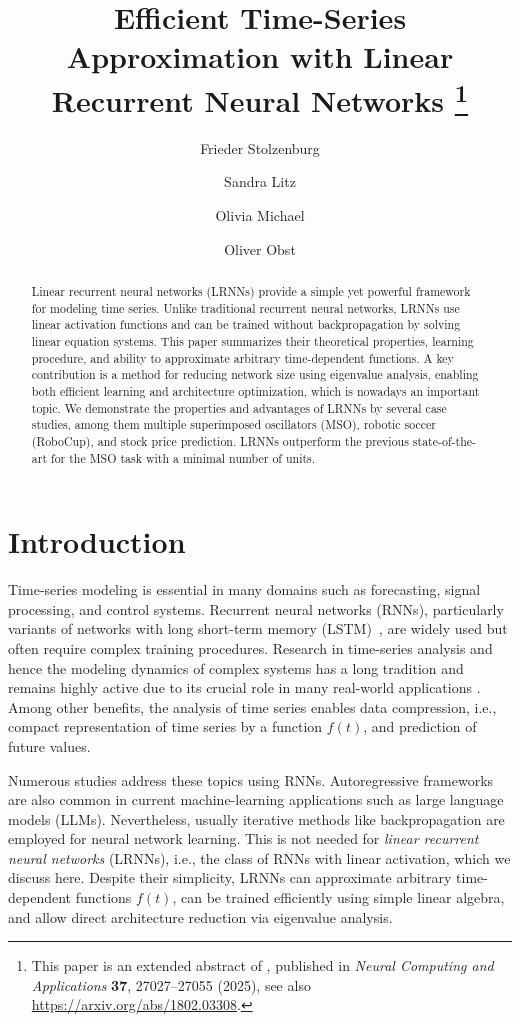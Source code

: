 \documentclass[11pt]{llncs}
\title{Efficient Time-Series Approximation with Linear Recurrent Neural Networks%
  \thanks{This paper is an extended abstract of \cite{SL+25}, published in
	\emph{Neural Computing and Applications} \textbf{37}, 27027–27055 (2025), see also \url{https://arxiv.org/abs/1802.03308}.}}
\author{Frieder Stolzenburg\inst{1,2} \and Sandra Litz \and Olivia Michael \and Oliver Obst\inst{2}}
\institute{
  Harz University of Applied Sciences, Wernigerode, Germany,
  \email{fstolzenburg@hs-harz.de}\\
\and
  School of Computer Science and Engineering, University of New South Wales
  (UNSW), Sydney, NSW, \email{\{f.stolzenburg,o.obst\}@unsw.edu.au}
}
\begin{document}
\maketitle

\begin{abstract}
Linear recurrent neural networks (LRNNs) provide a simple yet powerful framework
for modeling time series. Unlike traditional recurrent neural networks, LRNNs
use linear activation functions and can be trained without backpropagation by
solving linear equation systems. This paper summarizes their theoretical
properties, learning procedure, and ability to approximate arbitrary
time-dependent functions. A key contribution is a method for reducing network
size using eigenvalue analysis, enabling both efficient learning and
architecture optimization, which is nowadays an important topic. We
demonstrate the properties and advantages of LRNNs by several case studies,
among them multiple superimposed oscillators (MSO), robotic soccer (RoboCup),
and stock price prediction. LRNNs outperform the previous state-of-the-art for
the MSO task with a minimal number of units.
\end{abstract}

\section{Introduction}
Time-series modeling is essential in many domains such as forecasting, signal
processing, and control systems. Recurrent neural networks (RNNs), particularly
variants of networks with long short-term memory (LSTM)~\cite{HS97}, are widely
used but often require complex training procedures. Research in time-series
analysis and hence the modeling dynamics of complex systems has a long tradition
and remains highly active due to its crucial role in many real-world
applications \cite{LBE15}. Among other benefits, the analysis of time series
enables data compression, i.e., compact representation of time series by a
function $f(t)$, and prediction of future values.

Numerous studies address these topics using RNNs. Autoregressive
frameworks \cite{Aka69} are also common in current machine-learning applications
such as large language models (LLMs). Nevertheless, usually iterative methods
like backpropagation are employed for neural network learning. This is not
needed for \emph{linear recurrent neural networks} (LRNNs), i.e., the class of
RNNs with linear activation, which we discuss here. Despite their simplicity,
LRNNs can approximate arbitrary time-dependent functions $f(t)$, can be trained
efficiently using simple linear algebra, and allow direct architecture reduction
via eigenvalue analysis.
\end{document}

